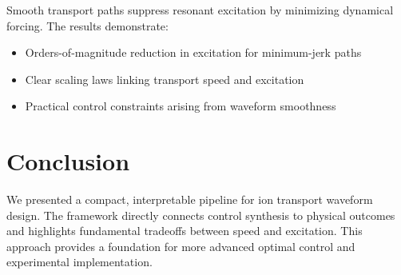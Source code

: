 \documentclass[11pt]{article}
\begin{document}
Smooth transport paths suppress resonant excitation by minimizing dynamical forcing. The results demonstrate:

\begin{itemize}
\item Orders-of-magnitude reduction in excitation for minimum-jerk paths
\item Clear scaling laws linking transport speed and excitation
\item Practical control constraints arising from waveform smoothness
\end{itemize}

\section{Conclusion}

We presented a compact, interpretable pipeline for ion transport waveform design. The framework directly connects control synthesis to physical outcomes and highlights fundamental tradeoffs between speed and excitation. This approach provides a foundation for more advanced optimal control and experimental implementation.
\end{document}
